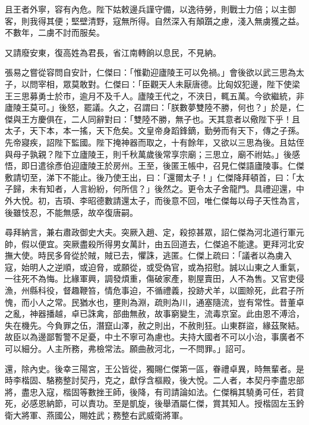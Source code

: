 \begin{pinyinscope}
 且王者外寧，容有內危。陛下姑敕邊兵謹守備，以逸待勞，則戰士力倍；以主御客，則我得其便；堅壁清野，寇無所得。自然深入有顛躓之慮，淺入無虜獲之益。不數年，二虜不討而服矣。



 又請廢安東，復高姓為君長，省江南轉餉以息民，不見納。



 張易之嘗從容問自安計，仁傑曰：「惟勸迎廬陵王可以免禍。」會後欲以武三思為太子，以問宰相，眾莫敢對。仁傑曰：「臣觀天人未厭唐德。比匈奴犯邊，陛下使梁王三思募勇士於市，逾月不及千人。廬陵王代之，不浹日，輒五萬。今欲繼統，非廬陵王莫可。」後怒，罷議。久之，召謂曰：「朕數夢雙陸不勝，何也？」於是，仁傑與王方慶俱在，二人同辭對曰：「雙陸不勝，無子也。天其意者以儆陛下乎！且太子，天下本，本一搖，天下危矣。文皇帝身蹈鋒鏑，勤勞而有天下，傳之子孫。先帝寢疾，詔陛下監國。陛下掩神器而取之，十有餘年，又欲以三思為後。且姑侄與母子孰親？陛下立廬陵王，則千秋萬歲後常享宗廟；三思立，廟不祔姑。」後感悟，即日遣徐彥伯迎廬陵王於房州。王至，後匿王帳中，召見仁傑語廬陵事。仁傑敷請切至，涕下不能止。後乃使王出，曰：「還爾太子！」仁傑降拜頓首，曰：「太子歸，未有知者，人言紛紛，何所信？」後然之。更令太子舍龍門。具禮迎還，中外大悅。初，吉頊、李昭德數請還太子，而後意不回，唯仁傑每以母子天性為言，後雖忮忍，不能無感，故卒復唐嗣。



 尋拜納言，兼右肅政御史大夫。突厥入趙、定，殺掠甚眾，詔仁傑為河北道行軍元帥，假以便宜。突厥盡殺所得男女萬計，由五回道去，仁傑追不能逮。更拜河北安撫大使。時民多脅從於賊，賊已去，懼誅，逃匿。仁傑上疏曰：「議者以為虜入寇，始明人之逆順，或迫脅，或願從，或受偽官，或為招慰。誠以山東之人重氣，一往死不為悔。比緣軍興，調發煩重，傷破家產，剔屋賣田，人不為售。又官吏侵漁，州縣科役，督趣鞭笞，情危事迫，不循禮義，投跡犬羊，以圖賒死，此君子所愧，而小人之常。民猶水也，壅則為淵，疏則為川，通塞隨流，豈有常性。昔董卓之亂，神器播越，卓已誅禽，部曲無赦，故事窮變生，流毒京室。此由恩不溥洽，失在機先。今負罪之伍，潛竄山澤，赦之則出，不赦則狂。山東群盜，緣茲聚結。故臣以為邊鄙暫警不足憂，中土不寧可為慮也。夫持大國者不可以小治，事廣者不可以細分。人主所務，弗檢常法。願曲赦河北，一不問罪。」詔可。



 還，除內史。後幸三陽宮，王公皆從，獨賜仁傑第一區，眷禮卓異，時無輩者。是時李楷固、駱務整討契丹，克之，獻俘含樞殿，後大悅。二人者，本契丹李盡忠部將，盡忠入寇，楷固等數挫王師，後降，有司請論如法。仁傑稱其驍勇可任，若貸死，必感恩納節，可以責功。至是凱旋，後舉酒屬仁傑，賞其知人。授楷固左玉鈐衛大將軍、燕國公，賜姓武；務整右武威衛將軍。




\end{pinyinscope}
